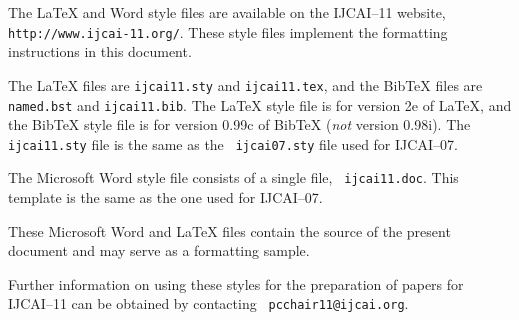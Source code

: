 \documentclass{article}
\begin{document}
The \LaTeX{} and Word style files are available on the IJCAI--11
website, {\tt http://www.ijcai-11.org/}.
These style files implement the formatting instructions in this
document.

The \LaTeX{} files are {\tt ijcai11.sty} and {\tt ijcai11.tex}, and
the Bib\TeX{} files are {\tt named.bst} and {\tt ijcai11.bib}. The
\LaTeX{} style file is for version 2e of \LaTeX{}, and the Bib\TeX{}
style file is for version 0.99c of Bib\TeX{} ({\em not} version
0.98i). The {\tt ijcai11.sty} file is the same as the {\tt
ijcai07.sty} file used for IJCAI--07.

The Microsoft Word style file consists of a single file, {\tt
ijcai11.doc}. This template is the same as the one used for
IJCAI--07.

These Microsoft Word and \LaTeX{} files contain the source of the
present document and may serve as a formatting sample.  

Further information on using these styles for the preparation of
papers for IJCAI--11 can be obtained by contacting {\tt
pcchair11@ijcai.org}.



\end{document}
